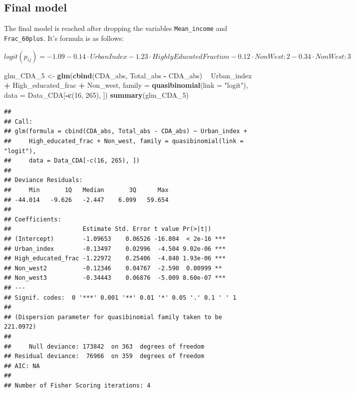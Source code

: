 \documentclass[11pt,]{article}
\newenvironment{Shaded}{\begin{snugshade}}{\end{snugshade}}
\newcommand{\KeywordTok}[1]{\textcolor[rgb]{0.13,0.29,0.53}{\textbf{#1}}}
\newcommand{\DataTypeTok}[1]{\textcolor[rgb]{0.13,0.29,0.53}{#1}}
\newcommand{\DecValTok}[1]{\textcolor[rgb]{0.00,0.00,0.81}{#1}}
\newcommand{\StringTok}[1]{\textcolor[rgb]{0.31,0.60,0.02}{#1}}
\newcommand{\OperatorTok}[1]{\textcolor[rgb]{0.81,0.36,0.00}{\textbf{#1}}}
\newcommand{\NormalTok}[1]{#1}
\begin{document}
\subsection{Final model}\label{final-model-1}

The final model is reached after dropping the variables
\texttt{Mean\_income} and \texttt{Frac\_60plus}. It's formula is as
follows:

\(logit(p_{ij}) = -1.09 -0.14 \cdot UrbanIndex -1.23 \cdot HighlyEducatedFraction - 0.12 \cdot NonWest:2 - 0.34 \cdot NonWest:3\)

\begin{Shaded}
\begin{Highlighting}[]
\NormalTok{glm_CDA_}\DecValTok{5}\NormalTok{ <-}\StringTok{ }\KeywordTok{glm}\NormalTok{(}\KeywordTok{cbind}\NormalTok{(CDA_abs, Total_abs }\OperatorTok{-}\StringTok{ }\NormalTok{CDA_abs) }\OperatorTok{~}\StringTok{ }\NormalTok{Urban_index }\OperatorTok{+}\StringTok{ }\NormalTok{High_educated_frac }\OperatorTok{+}\StringTok{ }
\StringTok{    }\NormalTok{Non_west, }\DataTypeTok{family =} \KeywordTok{quasibinomial}\NormalTok{(}\DataTypeTok{link =} \StringTok{"logit"}\NormalTok{), }\DataTypeTok{data =}\NormalTok{ Data_CDA[}\OperatorTok{-}\KeywordTok{c}\NormalTok{(}\DecValTok{16}\NormalTok{, }
    \DecValTok{265}\NormalTok{), ])}
\KeywordTok{summary}\NormalTok{(glm_CDA_}\DecValTok{5}\NormalTok{)}
\end{Highlighting}
\end{Shaded}

\begin{verbatim}
## 
## Call:
## glm(formula = cbind(CDA_abs, Total_abs - CDA_abs) ~ Urban_index + 
##     High_educated_frac + Non_west, family = quasibinomial(link = "logit"), 
##     data = Data_CDA[-c(16, 265), ])
## 
## Deviance Residuals: 
##     Min       1Q   Median       3Q      Max  
## -44.014   -9.626   -2.447    6.099   59.654  
## 
## Coefficients:
##                    Estimate Std. Error t value Pr(>|t|)    
## (Intercept)        -1.09653    0.06526 -16.804  < 2e-16 ***
## Urban_index        -0.13497    0.02996  -4.504 9.02e-06 ***
## High_educated_frac -1.22972    0.25406  -4.840 1.93e-06 ***
## Non_west2          -0.12346    0.04767  -2.590  0.00999 ** 
## Non_west3          -0.34443    0.06876  -5.009 8.60e-07 ***
## ---
## Signif. codes:  0 '***' 0.001 '**' 0.01 '*' 0.05 '.' 0.1 ' ' 1
## 
## (Dispersion parameter for quasibinomial family taken to be 221.0972)
## 
##     Null deviance: 173842  on 363  degrees of freedom
## Residual deviance:  76966  on 359  degrees of freedom
## AIC: NA
## 
## Number of Fisher Scoring iterations: 4
\end{verbatim}
\end{document}
